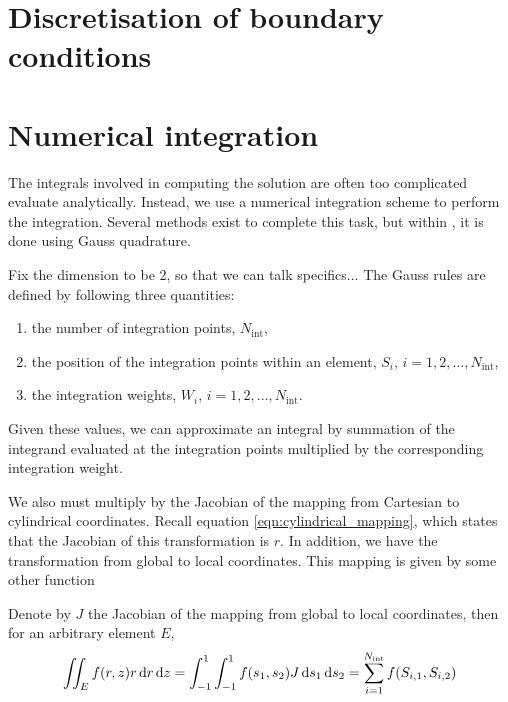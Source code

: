 
\section{Discretisation of boundary conditions}

\iffalse 
What are the boundary conditions that we have?
Sommerfeld, Neumann, PML..
How do we discretise these?
\fi





\section{Numerical integration}

The integrals involved in computing the solution are often too complicated evaluate analytically.
Instead, we use a numerical integration scheme to perform the integration.
Several methods exist to complete this task, but within \oomph, it is done using Gauss quadrature.

\cite{oomph}
Fix the dimension to be 2, so that we can talk specifics...
The Gauss rules are defined by following three quantities:
\begin{enumerate}
	\item the number of integration points, $N_\mathrm{int}$,
	\item the position of the integration points within an element, $S_i, \, i=1,2,\ldots,N_\mathrm{int}$,
	\item the integration weights, $W_i, \, i=1,2,\ldots,N_\mathrm{int}$.
\end{enumerate} 
Given these values, we can approximate an integral by summation of the integrand evaluated at the integration points multiplied by the corresponding integration weight.

We also must multiply by the Jacobian of the mapping from Cartesian to cylindrical coordinates.
Recall equation \eqref{eqn:cylindrical_mapping}, which states that the Jacobian of this transformation is $r$.
In addition, we have the transformation from global to local coordinates.
This mapping is given by some other function

Denote by $J$ the Jacobian of the mapping from global to local coordinates, then for an arbitrary element $E$, 
\begin{align}
	\iint_E f(r,z) r \,\mathrm{d} r \,\mathrm{d} z = \int_{-1}^1 \int_{-1}^1  f(s_1, s_2) J \, \mathrm{d} s_1 \, \mathrm{d} s_2 = \sum_{i=1}^{N_\mathrm{int}} f(S_{i,1},S_{i,2}) 
\end{align}






